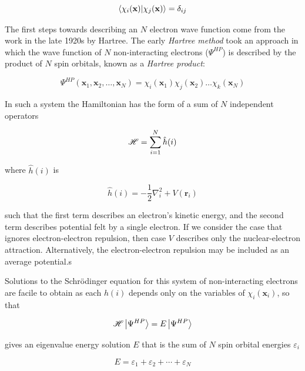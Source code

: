 \begin{equation}
\bra{\chi_i(\mathbf{x})}\ket{\chi_j(\mathbf{x})} = \delta_{ij}
\end{equation}

The first steps towards describing an $N$ electron wave function come from the
work in the late 1920s by Hartree. The early \emph{Hartree method} took an
approach in which the wave function of $N$ non-interacting electrons
($\Psi^{HP}$) is described by the product of $N$ spin orbitals, known as a
\emph{Hartree product}:

\begin{equation}
\Psi^{HP}(\mathbf{x}_1,\mathbf{x}_2,\ldots,\mathbf{x}_N) = \chi_i(\mathbf{x}_1)\chi_j(\mathbf{x}_2)\dots\chi_k(\mathbf{x}_N)
\end{equation}

\noindent In such a system the Hamiltonian has the form of a sum of $N$
independent operators

\begin{equation}
  \mathscr{H} = \sum_{i=1}^N \hat{h}(i)
\end{equation}

\noindent where $\hat{h}(i)$ is

\begin{equation}
  \hat{h}(i) = -\frac{1}{2} \nabla_i^2 + V(\mathbf{r}_i)
\end{equation}

\noindent such that the first term describes an electron's kinetic energy, and
the second term describes potential felt by a single electron. If we consider
the case that ignores electron-electron repulsion, then case $V$ describes only
the nuclear-electron attraction. Alternatively, the electron-electron repulsion
may be included as an average potential.s

Solutions to the Schr{\"o}dinger equation for this system of non-interacting
electrons are facile to obtain as each $h(i)$ depends only on the variables of
$\chi_i(\mathbf{x}_i)$, so that

\begin{equation}
  \mathscr{H} \ket{\Psi^{HP}} = E \ket{\Psi^{HP}}
\end{equation}

\noindent gives an eigenvalue energy solution $E$ that is the sum of $N$ spin
orbital energies $\varepsilon_i$

\begin{equation}
E = \varepsilon_1 + \varepsilon_2 + \cdots + \varepsilon_N
\end{equation}


